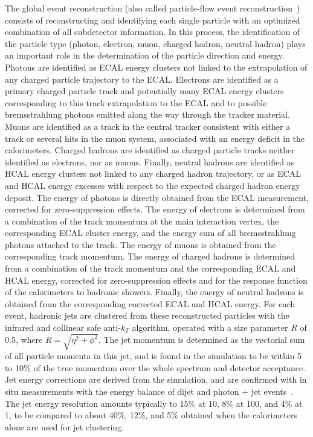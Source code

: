 The global event reconstruction (also called particle-flow event reconstruction~\cite{CMS-PAS-PFT-09-001,CMS-PAS-PFT-10-001}) consists of reconstructing and identifying each single particle with an optimized combination of all subdetector information. In this process, the identification of the particle type (photon, electron, muon, charged hadron, neutral hadron) plays an important role in the determination of the particle direction and energy. Photons are identified as ECAL energy clusters not linked to the extrapolation of any charged particle trajectory to the ECAL. Electrons are identified as a primary charged particle track and potentially many ECAL energy clusters corresponding to this track extrapolation to the ECAL and to possible bremsstrahlung photons emitted along the way through the tracker material. Muons are identified as a track in the central tracker consistent with either a track or several hits in the muon system, associated with an energy deficit in the calorimeters. Charged hadrons are identified as charged particle tracks neither identified as electrons, nor as muons. Finally, neutral hadrons are identified as HCAL energy clusters not linked to any charged hadron trajectory, or as ECAL and HCAL energy excesses with respect to the expected charged hadron energy deposit.
The energy of photons is directly obtained from the ECAL measurement, corrected for zero-suppression effects. The energy of electrons is determined from a combination of the track momentum at the main interaction vertex, the corresponding ECAL cluster energy, and the energy sum of all bremsstrahlung photons attached to the track. The energy of muons is obtained from the corresponding track momentum. The energy of charged hadrons is determined from a combination of the track momentum and the corresponding ECAL and HCAL energy, corrected for zero-suppression effects and for the response function of the calorimeters to hadronic showers. Finally, the energy of neutral hadrons is obtained from the corresponding corrected ECAL and HCAL energy.
For each event, hadronic jets are clustered from these reconstructed particles with the infrared and collinear safe anti-$k_T$ algorithm, operated with a size parameter $R$ of 0.5, where $R = \sqrt{\eta^2 + \phi^2}$. The jet momentum is determined as the vectorial sum of all particle momenta in this jet, and is found in the simulation to be within 5 to 10\% of the true momentum over the whole \pt spectrum and detector acceptance. Jet energy corrections are derived from the simulation, and are confirmed with in situ measurements with the energy balance of dijet and photon + jet events~\cite{Chatrchyan:2011ds}. The jet energy resolution amounts typically to 15\% at 10\GeV, 8\% at 100\GeV, and 4\% at 1\TeV, to be compared to about 40\%, 12\%, and 5\% obtained when the calorimeters alone are used for jet clustering.

